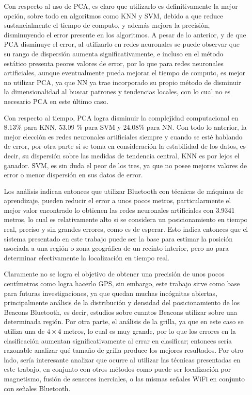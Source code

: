 Con respecto al uso de PCA, es claro que utilizarlo es definitivamente la mejor opción, sobre todo en algoritmos como KNN y SVM, debido a que reduce sustancialmente el tiempo de computo, y además mejora la precisión, disminuyendo el error presente en los algoritmos. A pesar de lo anterior, y de que PCA disminuye el error, al utilizarlo en redes neuronales se puede observar que su rango de dispersión aumenta significativamente, e incluso en el método estático presenta peores valores de error, por lo que para redes neuronales artificiales, aunque eventualmente pueda mejorar el tiempo de computo, es mejor no utilizar PCA, ya que  NN ya trae incorporado su propio método de disminuir la dimensionalidad al buscar patrones y tendencias locales, con lo cual no es necesario PCA en este último caso.

Con respecto al tiempo, PCA logra disminuir la complejidad computacional en 8.13\% para KNN, 53.09 \% para SVM y 24.08\% para NN. Con todo lo anterior, la mejor elección es redes neuronales artificiales siempre y cuando se esté hablando de error, por otra parte si se toma en consideración la estabilidad de los datos, es decir, su dispersión sobre las medidas de tendencia central, KNN es por lejos el ganador. SVM, es sin duda el peor de los tres, ya que no posee mejores valores de error o menor dispersión en sus datos de error.

Los análisis indican entonces que utilizar Bluetooth con técnicas de máquinas de aprendizaje, pueden reducir el error a unos pocos metros, particularmente el mejor valor encontrado lo obtienen las redes neuronales artificiales con 3.9341 metros, lo cual es relativamente alto si se considera un posicionamiento en tiempo real, preciso y sin grandes errores, como es de esperar. Esto indica entonces que el sistema presentado en este trabajo puede ser la base para estimar la posición asociada a una región o zona geográfica de un recinto interior, pero no para determinar efectivamente la localización en tiempo real.

Claramente no se logra el objetivo de obtener una precisión de unos pocos centímetros como logra hacerlo GPS, sin embargo, este trabajo sirve como base para futuras investigaciones, ya que quedan muchas incógnitas abiertas, principalmente análisis de la distribución y densidad del posicionamiento de los Beacons Bluetooth, es decir, estudios sobre cuantos Beacons utilizar sobre una determinada región. Por otra parte, el análisis de la grilla, ya que en este caso se utiliza una de $ 4\times 4$ metros, lo cual es muy grande, por lo que los errores en la clasificación aumentan significativamente al errar en clasificar; entonces sería razonable analizar qué tamaño de grilla produce los mejores resultados. Por otro lado, sería interesante analizar que ocurre al utilizar las técnicas presentadas en este trabajo, en conjunto con otros métodos como puede ser localización por magnetismo, fusión de sensores inerciales, o las mismas señales WiFi en conjunto con señales Bluetooth.

